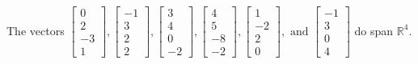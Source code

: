 \begin{exercise}
\begin{exerciseStatement}
  \end{exerciseStatement}
  \begin{exerciseAnswer}
   The vectors \(\left[\begin{array}{r}
0 \\
2 \\
-3 \\
1
\end{array}\right] , \left[\begin{array}{r}
-1 \\
3 \\
2 \\
2
\end{array}\right] , \left[\begin{array}{r}
3 \\
4 \\
0 \\
-2
\end{array}\right] , \left[\begin{array}{r}
4 \\
5 \\
-8 \\
-2
\end{array}\right] , \left[\begin{array}{r}
1 \\
-2 \\
2 \\
0
\end{array}\right] , \text{ and } \left[\begin{array}{r}
-1 \\
3 \\
0 \\
4
\end{array}\right]\) 
  	 do  
	span \(\mathbb{R}^4\).
  


  \end{exerciseAnswer}
\end{exercise}